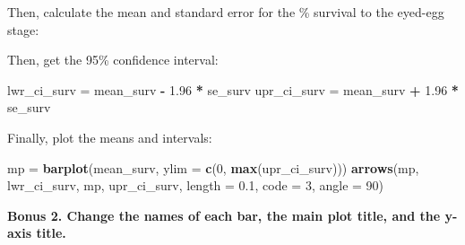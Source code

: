 \documentclass[]{book}
\newenvironment{Shaded}{\begin{snugshade}}{\end{snugshade}}
\newcommand{\KeywordTok}[1]{\textcolor[rgb]{0.13,0.29,0.53}{\textbf{#1}}}
\newcommand{\DataTypeTok}[1]{\textcolor[rgb]{0.13,0.29,0.53}{#1}}
\newcommand{\DecValTok}[1]{\textcolor[rgb]{0.00,0.00,0.81}{#1}}
\newcommand{\FloatTok}[1]{\textcolor[rgb]{0.00,0.00,0.81}{#1}}
\newcommand{\StringTok}[1]{\textcolor[rgb]{0.31,0.60,0.02}{#1}}
\newcommand{\OperatorTok}[1]{\textcolor[rgb]{0.81,0.36,0.00}{\textbf{#1}}}
\newcommand{\NormalTok}[1]{#1}
\theoremstyle{definition}
\theoremstyle{definition}
\theoremstyle{definition}
\theoremstyle{remark}
\begin{document}
Then, calculate the mean and standard error for the \% survival to the
eyed-egg stage:

\begin{Shaded}
\end{Shaded}

Then, get the 95\% confidence interval:

\begin{Shaded}
\begin{Highlighting}[]
\NormalTok{lwr_ci_surv =}\StringTok{ }\NormalTok{mean_surv }\OperatorTok{-}\StringTok{ }\FloatTok{1.96} \OperatorTok{*}\StringTok{ }\NormalTok{se_surv}
\NormalTok{upr_ci_surv =}\StringTok{ }\NormalTok{mean_surv }\OperatorTok{+}\StringTok{ }\FloatTok{1.96} \OperatorTok{*}\StringTok{ }\NormalTok{se_surv}
\end{Highlighting}
\end{Shaded}

Finally, plot the means and intervals:

\begin{Shaded}
\begin{Highlighting}[]
\NormalTok{mp =}\StringTok{ }\KeywordTok{barplot}\NormalTok{(mean_surv, }\DataTypeTok{ylim =} \KeywordTok{c}\NormalTok{(}\DecValTok{0}\NormalTok{, }\KeywordTok{max}\NormalTok{(upr_ci_surv)))}
\KeywordTok{arrows}\NormalTok{(mp, lwr_ci_surv, mp, upr_ci_surv, }\DataTypeTok{length =} \FloatTok{0.1}\NormalTok{, }\DataTypeTok{code =} \DecValTok{3}\NormalTok{, }\DataTypeTok{angle =} \DecValTok{90}\NormalTok{)}
\end{Highlighting}
\end{Shaded}

\textbf{Bonus 2. Change the names of each bar, the main plot title, and
the y-axis title. }

\begin{Shaded}
\end{Shaded}
\end{document}
